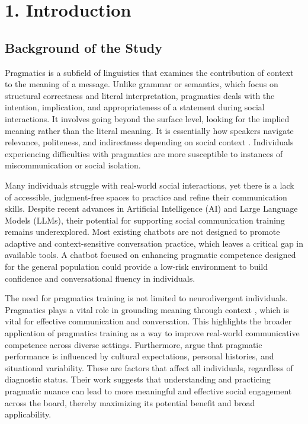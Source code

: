 %
%
%                 

\chapter{1. Introduction}\label{sec:intro}


\section{Background of the Study}

\indent Pragmatics is a subfield of linguistics that examines the contribution of context to the meaning of a message.
Unlike grammar or semantics, which focus on structural correctness and literal interpretation,
pragmatics deals with the intention, implication, and appropriateness of a statement during social interactions. It involves
going beyond the surface level, looking for the implied meaning rather than the literal meaning. It is essentially how speakers navigate relevance,
politeness, and indirectness depending on social context \cite{marasabessy_pragmatic_2023}. Individuals experiencing difficulties with pragmatics 
are more susceptible to instances of miscommunication or social isolation.

Many individuals struggle with real-world social interactions, yet there is a lack of accessible, judgment-free spaces to practice and refine 
their communication skills. Despite recent advances in Artificial Intelligence (AI) and Large Language Models (LLMs), their potential for 
supporting social communication training remains underexplored. Most existing chatbots are not designed to promote adaptive and context-sensitive 
conversation practice, which leaves a critical gap in available tools. A chatbot focused on enhancing pragmatic competence designed for the general
population could provide a low-risk environment to build confidence and conversational fluency in individuals.

The need for pragmatics training is not limited to neurodivergent individuals. Pragmatics plays a vital role in grounding meaning through 
context \cite{fried_pragmatics_2023}, which is vital for effective communication and conversation. This highlights the broader application of pragmatics 
training as a way to improve real-world communicative competence across diverse settings. Furthermore,\cite{gibbs_pragmatics_2020} argue that 
pragmatic performance is influenced by cultural expectations, personal histories, and situational variability. These are factors that affect all individuals,
regardless of diagnostic status. Their work suggests that understanding and practicing pragmatic nuance can lead to more meaningful and effective 
social engagement across the board, thereby maximizing its potential benefit and broad applicability.

